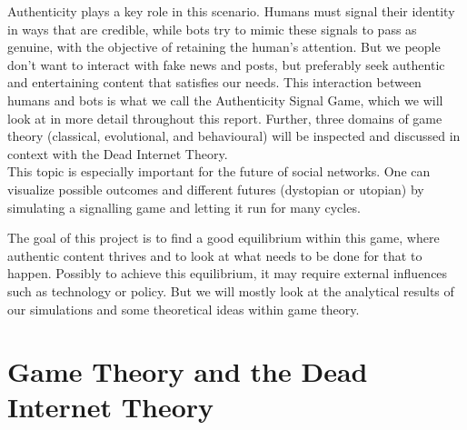 \documentclass{article}
\begin{document}
Authenticity plays a key role in this scenario. Humans must signal their identity in ways that are credible, while bots try to mimic these signals to pass as genuine, with the objective of retaining the human's attention. But we people don't want to interact with fake news and posts, but preferably seek authentic and entertaining content that satisfies our needs. This interaction between humans and bots is what we call the Authenticity Signal Game, which we will look at in more detail throughout this report. Further, three domains of game theory (classical, evolutional, and behavioural) will be inspected and discussed in context with the Dead Internet Theory. \\
This topic is especially important for the future of social networks. One can visualize possible outcomes and different futures (dystopian or utopian) by simulating a signalling game and letting it run for many cycles.

The goal of this project is to find a good equilibrium within this game, where authentic content thrives and to look at what needs to be done for that to happen. Possibly to achieve this equilibrium, it may require external influences such as technology or policy. But we will mostly look at the analytical results of our simulations and some theoretical ideas within game theory.


\newpage

\section{Game Theory and the Dead Internet Theory} 



\end{document}

